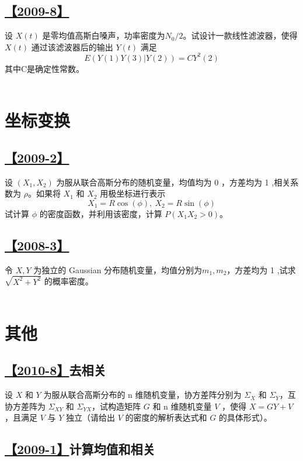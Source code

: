 \subsection{\hyperref[A2009-8]{【2009-8】}}\label{Q2009-8}
设 $X(t)$ 是零均值高斯白嗓声，功率密度为$N_0/2$。试设计一款线性滤波器，使得 $X(t)$ 通过该滤波器后的输出 $Y(t)$ 满足
$$
E(Y(1)Y(3)|Y(2))=CY^2(2)
$$
其中C是确定性常数。
\\\\
\section{坐标变换} 
\subsection{\hyperref[A2009-2]{【2009-2】}}\label{Q2009-2} 
设 $(X_1, X_2)$ 为服从联合高斯分布的随机变量，均值均为 0 ，方差均为 1 ,相关系数为 $\rho$。如果将 $X_1$ 和 $X_2$ 用极坐标进行表示
$$
X_1=R\cos(\phi), \ X_2=R\sin(\phi)
$$
试计算 $\phi$ 的密度函数，并利用该密度，计算 $P(X_1X_2>0)$。

\subsection{\hyperref[A2008-3]{【2008-3】}}\label{Q2008-3}

令 $X,Y$ 为独立的 Gaussian 分布随机变量，均值分别为$m_1, m_2$，方差均为 1 ,试求 $\sqrt{X^2+Y^2}$ 的概率密度。
\\\\
\section{其他}

\subsection{\hyperref[A2010-8]{【2010-8】}去相关}\label{Q2010-8}

设 $X$ 和 $Y$ 为服从联合高斯分布的 n 维随机变量，协方差阵分别为 $\Sigma_X$ 和 $\Sigma_Y$，互协方差阵为 $\Sigma_{XY}$ 和 $\Sigma_{YX}$，试构造矩阵 $G$ 和 n 维随机变量 $V$ ，使得 $X=GY+V$，且满足 $V$ 与 $Y$ 独立（请给出 $V$ 的密度的解析表达式和 $G$ 的具体形式）。

\subsection{\hyperref[A2009-1]{【2009-1】}计算均值和相关}\label{Q2009-1}

